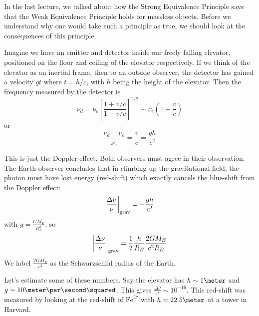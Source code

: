 \documentclass[a4paper,twoside,master.tex]{subfiles}
\begin{document}

In the last lecture, we talked about how the Strong Equivalence Principle says that the Weak Equivalence Principle holds for massless objects. Before we understand why one would take such a principle as true, we should look at the consequences of this principle.

Imagine we have an emitter and detector inside our freely falling elevator, positioned on the floor and ceiling of the elevator respectively. If we think of the elevator as an inertial frame, then to an outside observer, the detector has gained a velocity $ g t $ where $ t = h/c $, with $ h $ being the height of the elevator. Then the frequency measured by the detector is
\begin{equation}
    \nu_d = \nu_e \left[ \frac{1 + v/c}{1 - v/c} \right]^{1/2} \sim \nu_e \left( 1 + \frac{v}{c} \right)
\end{equation}
or
\begin{equation}
    \frac{\nu_d - \nu_e}{\nu_e} = \frac{v}{c} = \frac{gh}{c^2}
\end{equation}

This is just the Doppler effect. Both observers must agree in their observation. The Earth observer concludes that in climbing up the gravitational field, the photon must have lost energy (red-shift) which exactly cancels the blue-shift from the Doppler effect:
\begin{equation}
    \eval{\frac{\Delta \nu}{\nu}}_{\text{grav}} = - \frac{gh}{c^2}
\end{equation}
with $ g = \frac{GM_E}{R^2_E} $, so
\begin{equation}
    \abs{\frac{\Delta \nu}{\nu}}_{\text{grav}} = \frac{1}{2} \frac{h}{R_E} \frac{2GM_E}{c^2 R_E}
\end{equation}
We label $ \frac{2 G M_E}{c^2} $ as the Schwarzschild radius of the Earth.

Let's estimate some of these numbers. Say the elevator has $ h \sim 1 \meter $ and $ g \sim 10 \meter\per\second\squared $. This gives $ \frac{\Delta \nu}{\nu} \sim 10^{-16} $. This red-shift was measured by looking at the red-shift of $ \text{Fe}^{57} $ with $ h = 22.5 \meter $ at a tower in Harvard.
\end{document}
